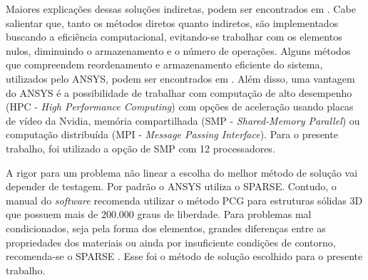 Maiores explicações dessas soluções indiretas, podem ser encontrados em . Cabe salientar que, tanto os métodos diretos quanto indiretos, são implementados buscando a eficiência computacional, evitando-se trabalhar com os elementos nulos, diminuindo o armazenamento e o número de operações. Alguns métodos que compreendem reordenamento e armazenamento eficiente do sistema, utilizados pelo ANSYS, podem ser encontrados em . Além disso, uma vantagem do ANSYS é a possibilidade de trabalhar com computação de alto desempenho (HPC - \textit{High Performance Computing}) com opções de aceleração usando placas de vídeo da Nvidia, memória compartilhada (SMP - \textit{Shared-Memory Parallel}) ou computação distribuída (MPI - \textit{Message Passing Interface}). Para o presente trabalho, foi utilizado a opção de SMP com 12 processadores.

A rigor para um problema não linear a escolha do melhor método de solução vai depender de testagem. Por padrão o ANSYS utiliza o SPARSE. Contudo, o manual do \textit{software} recomenda utilizar o método PCG para estruturas sólidas 3D que possuem mais de 200.000 graus de liberdade. Para problemas mal condicionados, seja pela forma dos elementos, grandes diferenças entre as propriedades dos materiais ou ainda por insuficiente condições de contorno, recomenda-se o SPARSE \cite[p. 242]{ANSYS2018b}. Esse foi o método de solução escolhido para o presente trabalho.

